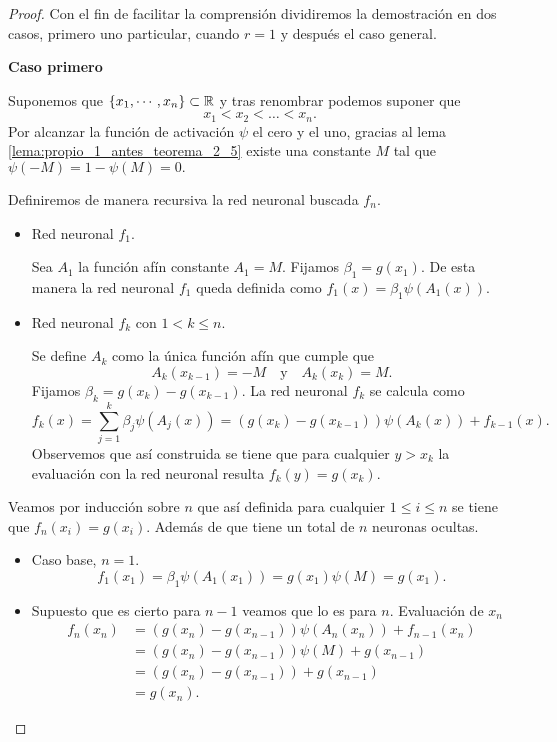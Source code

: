 \begin{proof}
Con el fin de facilitar la comprensión dividiremos la demostración en dos casos, 
primero uno particular, cuando $r=1$ y después el caso general.

\textbf{Caso primero}

Suponemos que $\{x_1, \cdots, x_n\} \subset \mathbb{R}$ y tras renombrar 
podemos suponer que 
\begin{equation}
    x_1 < x_2 < \ldots < x_n. 
\end{equation}
Por alcanzar la función de activación $\psi$ el cero y el uno, 
gracias al lema  \ref{lema:propio_1_antes_teorema_2_5} existe una constante $M$ tal que $\psi(-M) = 1-\psi(M) = 0.$

Definiremos de manera recursiva la red neuronal buscada $f_n$. 

\begin{itemize}
    \item Red neuronal $f_1$. 

Sea $A_1$ la función afín constante $A_1 = M.$
Fijamos $\beta_1 = g(x_1)$. 
De esta manera la red neuronal $f_1$ queda
definida como $f_1(x) = \beta_1 \psi(A_1(x)).$

\item Red neuronal $f_k$ con $1 < k \leq n$. 

Se define $A_{k}$ como la única función afín que cumple que 
\begin{equation}
    A_k(x_{k-1}) = -M \quad \text{y} \quad  A_{k}(x_k)= M.
\end{equation}
Fijamos $\beta_k = g(x_k) - g(x_{k-1})$. 
La red neuronal $f_k$ se calcula como 
\begin{equation}
    f_k(x) 
    = 
    \sum_{j=1}^k \beta_j \psi(A_j(x))
     = 
    (g(x_k)-g(x_{k-1})) \psi(A_k(x)) + f_{k-1}(x) .  
\end{equation}
Observemos que así construida se tiene que para cualquier
 $y > x_k$ la evaluación con la red neuronal resulta $f_k(y) = g(x_k).$

\end{itemize}
Veamos por inducción sobre $n$ que así definida para cualquier $1 \leq i \leq n$ se tiene que     
$f_n(x_i) = g(x_i)$. 
Además de que tiene un total de $n$ neuronas ocultas. 

\begin{itemize}
    \item Caso base, $n=1$. 
    \begin{equation}
        f_1(x_1)= \beta_1 \psi(A_1(x_1)) = g(x_1)\psi(M) = g(x_1).
    \end{equation}
    \item Supuesto que es cierto para $n-1$ veamos que lo es para $n$.      
    Evaluación de $x_n$
    \begin{align}
        f_n(x_n) 
        &= 
        (g(x_n) - g(x_{n-1}))\psi(A_n(x_n)) + f_{n-1}(x_n)
        \\
        & = (g(x_n) - g(x_{n-1}))\psi(M) + g(x_{n-1}) 
        \\
        & = (g(x_n) - g(x_{n-1})) + g(x_{n-1}) 
        \\
        & = g(x_n).
    \end{align}


\end{itemize}
\end{proof}
